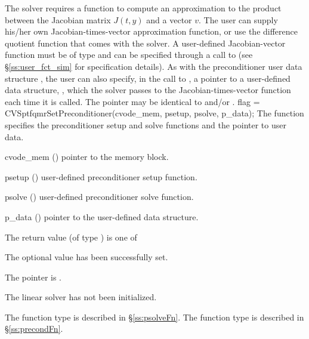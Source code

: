 The 
{\cvsptfqmr} solver requires a function to compute an approximation to the
product between the Jacobian matrix $J(t,y)$ and a vector $v$.
The user can supply his/her own Jacobian-times-vector approximation function, 
or use the difference quotient function  
that comes with the {\cvsptfqmr} solver.
A user-defined Jacobian-vector function must be of type  and 
can be specified through a call to  
(see \S\ref{ss:user_fct_sim} for specification details).
As with the preconditioner user data structure , 
the user can also specify, in the call to , a pointer to a 
user-defined data structure, , which
the {\cvsptfqmr} solver passes to the Jacobian-times-vector function 
each time it is called.  
The pointer  may be identical to  and/or .
{
  flag = CVSptfqmrSetPreconditioner(cvode\_mem, psetup, psolve, p\_data);
}
{
  The function  specifies the preconditioner
  setup and solve functions and the pointer to user data.
}
{
  \begin{args}
  \item[cvode\_mem] ()
    pointer to the {\cvode} memory block.
  \item[psetup] ()
    user-defined preconditioner setup function.
  \item[psolve] ()
    user-defined preconditioner solve function.
  \item[p\_data] ()
     pointer to the user-defined data structure.
  \end{args}
}
{
  The return value  (of type ) is one of
  \begin{args}
  \item[\Id{CVSPTFQMR\_SUCCESS}] 
    The optional value has been successfully set.
  \item[\Id{CVSPTFQMR\_MEM\_NULL}]
    The  pointer is .
  \item[\Id{CVSPTFQMR\_LMEM\_NULL}]
    The {\cvsptfqmr} linear solver has not been initialized.
  \end{args}
}
{
   The function type  is described in \S\ref{ss:psolveFn}.
   The function type  is described in \S\ref{ss:precondFn}.
}

